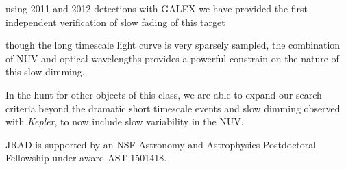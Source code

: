 \documentclass[twocolumn]{aastex6}
\newcommand{\Kepler}{\textsl{Kepler}\xspace}
\begin{document}
using 2011 and 2012 detections with GALEX we have provided the first independent verification of slow fading of this target

though the long timescale light curve is very sparsely sampled, the combination of NUV and optical wavelengths provides a powerful constrain on the nature of this slow dimming. 

In the hunt for other objects of this class, we are able to expand our search criteria beyond the dramatic short timescale events and slow dimming observed with \Kepler, to now include slow variability in the NUV. 



\acknowledgments
JRAD is supported by an NSF Astronomy and Astrophysics Postdoctoral Fellowship under award AST-1501418. 



\end{document}
